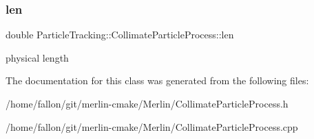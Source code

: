 \subsubsection{\texorpdfstring{len}{len}}
{\footnotesize\ttfamily double Particle\+Tracking\+::\+Collimate\+Particle\+Process\+::len\hspace{0.3cm}{\ttfamily [protected]}}

physical length 

The documentation for this class was generated from the following files\+:\begin{DoxyCompactItemize}
\item 
/home/fallon/git/merlin-\/cmake/\+Merlin/Collimate\+Particle\+Process.\+h\item 
/home/fallon/git/merlin-\/cmake/\+Merlin/Collimate\+Particle\+Process.\+cpp\end{DoxyCompactItemize}
